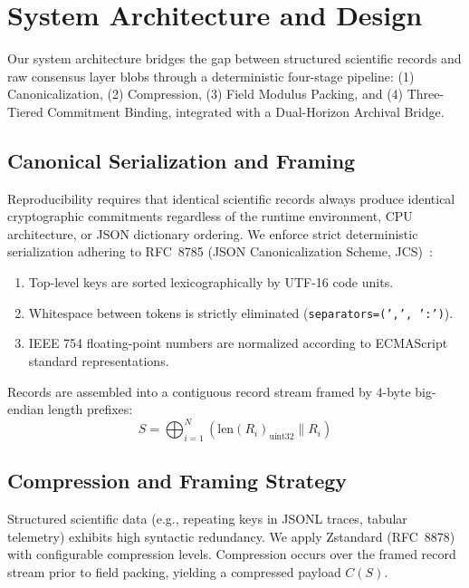 \section{System Architecture and Design}
\label{sec:design}

Our system architecture bridges the gap between structured scientific records and raw consensus layer blobs through a deterministic four-stage pipeline: (1) Canonicalization, (2) Compression, (3) Field Modulus Packing, and (4) Three-Tiered Commitment Binding, integrated with a Dual-Horizon Archival Bridge.

\subsection{Canonical Serialization and Framing}
Reproducibility requires that identical scientific records always produce identical cryptographic commitments regardless of the runtime environment, CPU architecture, or JSON dictionary ordering. We enforce strict deterministic serialization adhering to RFC~8785 (JSON Canonicalization Scheme, JCS)~\cite{rfc8785}:
\begin{enumerate}
    \item Top-level keys are sorted lexicographically by UTF-16 code units.
    \item Whitespace between tokens is strictly eliminated (\texttt{separators=(',', ':')}).
    \item IEEE 754 floating-point numbers are normalized according to ECMAScript standard representations.
\end{enumerate}
Records are assembled into a contiguous record stream framed by 4-byte big-endian length prefixes:
\begin{equation}
S = \bigoplus_{i=1}^N \left( \text{len}(R_i)_{\text{uint32}} \parallel R_i \right)
\end{equation}

\subsection{Compression and Framing Strategy}
Structured scientific data (e.g., repeating keys in JSONL traces, tabular telemetry) exhibits high syntactic redundancy. We apply Zstandard (RFC~8878)~\cite{rfc8878} with configurable compression levels. Compression occurs over the framed record stream prior to field packing, yielding a compressed payload $C(S)$.

